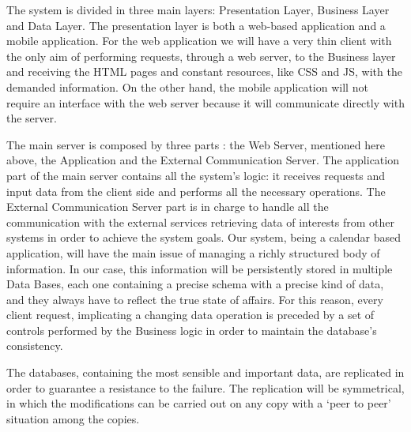The system is divided in three main layers: Presentation Layer, Business Layer and Data Layer.
The presentation layer is both a web-based application and a mobile application. For the web application we will have a very thin client with the only aim of performing requests, through a web server, to the Business layer and receiving the HTML pages and constant resources, like CSS and JS, with the demanded information.
On the other hand, the mobile application will not require an interface with the web server because it will communicate directly with the server.

The main server is composed by three parts : the Web Server, mentioned here above, the Application and the External Communication Server. The application part of the main server contains all the system's logic: it receives requests and input data from the client side and performs all the necessary operations.
The External Communication Server part is in charge to handle all the communication with the external services retrieving data of interests from other systems in order to achieve the system goals.
Our system, being a calendar based application, will have the main issue of managing a richly structured body of information. In our case, this information will be persistently stored in multiple Data Bases, each one containing a precise schema with a precise kind of data, and they always have to reflect the true state of affairs. For this reason, every client request, implicating a changing data operation is preceded by a set of controls performed by the Business logic in order to maintain the database’s consistency.\par
The databases, containing the most sensible and important data, are replicated in order to guarantee a resistance to the failure. 
The replication will be symmetrical, in which the modifications can be carried out on any copy with a ‘peer to peer’ situation among the copies.

